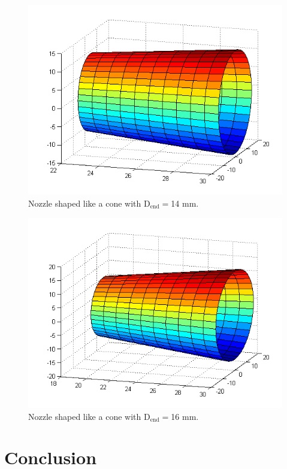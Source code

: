 \documentclass[10pt,a4paper]{article}
\begin{document}
\begin{figure}[H]
\centering
\includegraphics[scale=1]{Bilder/Discussion/cone_D14.png}
\caption{Nozzle shaped like a cone with D$_\mathrm{{end}}=$14 mm.} \label{fig:cone_D14}
\end{figure}

\begin{figure}[H]
\centering
\includegraphics[scale=1]{Bilder/Discussion/cone_D16.png}
\caption{Nozzle shaped like a cone with D$_\mathrm{{end}}=$16 mm.} \label{fig:cone_D16}
\end{figure}

\newpage

\section{Conclusion}
\end{document}
